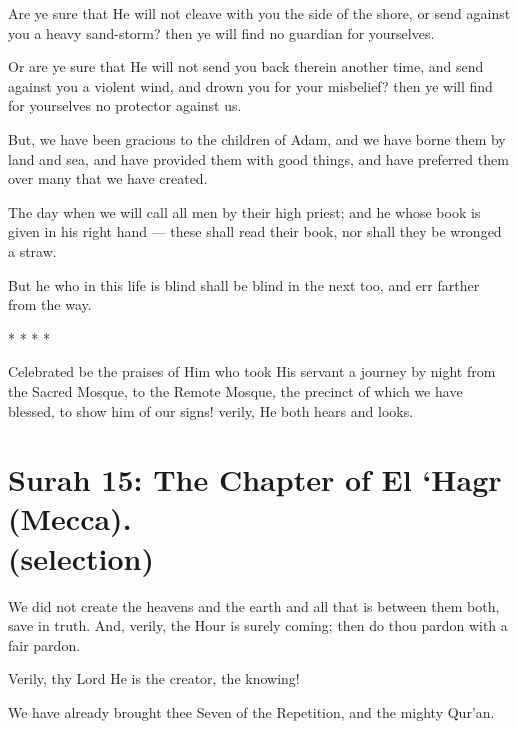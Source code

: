 \documentclass[fontsize=14pt, letterpaper, notitlepage, openany, DIV=12]{scrbook} %
\begin{document}
\noindent[17:68]
Are ye sure that He will not cleave with you the side of the shore, or send against you a
heavy sand-storm? then ye will find no guardian for yourselves.

\noindent[17:69]
Or are ye sure that He will not send you back therein another time, and send against you a
violent wind, and drown you for your misbelief? then ye will find for yourselves no protector
against us.

\noindent[17:70]
But, we have been gracious to the children of Adam, and we have borne them by land
and sea, and have provided them with good things, and have preferred them over many that we
have created.

\noindent[17:71]
The day when we will call all men by their high priest; and he whose book is given in his
right hand --- these shall read their book, nor shall they be wronged a straw.

\noindent[17:72]
But he who in this life is blind shall be blind in the next too, and err farther from the way.

\begin{center}
  {\Huge
    *
    \hspace{2em}
    *
    \hspace{2em}
    *
    \hspace{2em}
    *
  }
\end{center}

\noindent[17:1]
Celebrated be the praises of Him who took His servant a journey by night from the
Sacred Mosque, to the Remote Mosque, the precinct of which we have blessed, to show him of
our signs! verily, He both hears and looks.


\section[Surah 15: The Chapter of El `Hagr (Mecca).]{Surah 15: The Chapter of El `Hagr (Mecca).\\ (selection)}


\noindent[15:85]
We did not create the heavens and the earth and all that is between them both, save in
truth. And, verily, the Hour is surely coming; then do thou pardon with a fair pardon.

\noindent[15:86]
Verily, thy Lord He is the creator, the knowing!

\noindent[15:87]
We have already brought thee Seven of the Repetition, and the mighty Qur'an.
\end{document}

